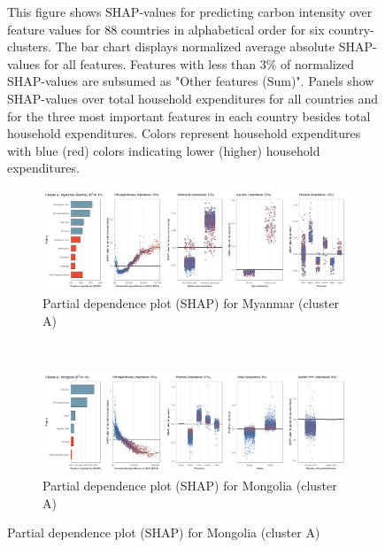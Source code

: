 \begin{figure}[ht!]
    \begin{subcaption2}
     This figure shows SHAP-values for predicting carbon intensity over feature values for 88 countries in alphabetical order for six country-clusters. The bar chart displays normalized average absolute SHAP-values for all features. Features with less than 3\% of normalized SHAP-values are subsumed as "Other features (Sum)". Panels show SHAP-values over total household expenditures for all countries and for the three most important features in each country besides total household expenditures. Colors represent household expenditures with blue (red) colors indicating lower (higher) household expenditures.
     \end{subcaption2}
\end{figure}

\begin{figure}[ht!]\ContinuedFloat
    \centering
   \begin{subfigure}[b]{\textwidth}
   \centering
         \caption{Partial dependence plot (SHAP) for Myanmar (cluster A)}
         \label{fig:5b_MMR}
         \includegraphics[width=\textwidth]{Figure 5b/Figure_5b_MMR}     
         \end{subfigure}
    \\
    \vspace{0.5cm}
    \begin{subfigure}[b]{\textwidth}
   \centering
         \caption{Partial dependence plot (SHAP) for Mongolia (cluster A)}
         \label{fig:5b_MNG}
         \includegraphics[width=\textwidth]{Figure 5b/Figure_5b_MNG}
         \end{subfigure}

\end{figure}
